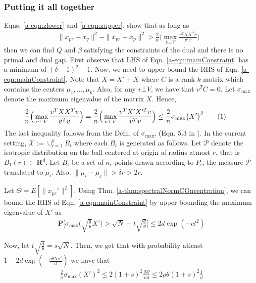 \documentclass[12pt]{article}
\newcommand{\mc}{\mathcal}
\newcommand{\mb}{\mathbf}
\newcommand\numberthis{\addtocounter{equation}{1}\tag{\theequation}}
\begin{document}
\subsubsection*{Putting it all together}
Eqns. \ref{a-eqn:zlower} and \ref{a-eqn:zupper}, show that as long as 
\begin{align}
  \|x_{pr} - x_q\|^2 - \|x_{pr}-x_p\|^2  > \frac{2}{n}\Big(\max_{v\bot V} \frac{v^T XX^Tv}{v^Tv}\Big)\label{a-eqn:mainConstraint}
\end{align}
  then we can find $Q$ and $\beta$ satisfying the constraints of the dual and there is no primal and dual gap. First observe that LHS of Eqn. \ref{a-eqn:mainConstraint} has a minimum of $(\delta - 1)^2 - 1$. Now, we need to upper bound the RHS of Eqn. \ref{a-eqn:mainConstraint}. Note that $X = X' + X$ where $C$ is a rank $k$ matrix which contains the centers $\mu_1, \ldots, \mu_k$. Also, for any $v \bot V$, we have that $v^TC = 0$. Let $\sigma_{\max}$ denote the maximum eigenvalue of the matrix $X$. Hence, 
\begin{align*}
  &\frac{2}{n}\Big(\max_{v\bot V} \frac{v^T XX^Tv}{v^Tv}\Big) = \frac{2}{n}\Big(\max_{v\bot V} \frac{v^T X'X'^Tv}{v^Tv}\Big) \le \frac{2}{n}\sigma_{\max}\big(X'\big)^2\numberthis\label{a-eqn:mainConstrintUpper}
\end{align*}
The last inequality follows from the Defn. of $\sigma_{\max}$. (Eqn. 5.3 in \cite{vershynin2010introduction}). In the current setting, $\mc X := \cup_{i=1}^k B_i$ where each $B_i$ is generated as follows. Let $\mc P$ denote the isotropic distribution on the ball centered at origin of radius atmost $r$, that is $B_1(r)\subset \mb R^d$. Let $B_i$ be a set of $n_i$ points drawn according to $P_i$, the measure $\mc P$ translated to $\mu_i$. Also, $\|\mu_i - \mu_j\| > \delta r > 2r$. 

Let $\Theta = E[\|x_{pr}'\|^2]$. Using Thm. \ref{a-thm:spectralNormCOncentration}, we can bound the RHS of Eqn. \ref{a-eqn:mainConstraint} by upper bounding the maximum eigenvalue of $X'$ as 
\begin{align}
  &\mb P\bigg[\sigma_{\max}\bigg(\sqrt{\frac{d}{\theta}}X'\bigg) > \sqrt{N} + t\sqrt{\frac{d}{\theta}} \bigg] \le 2d\exp(-ct^2)
\end{align}

Now, let $t\sqrt{\frac{d}{\theta}} = s\sqrt{N}$. Then, we get that with probability atleast $1-2d\exp(-\frac{c\theta Ns^2}{d})$ we have that 
\begin{align*}
  &\frac{2}{n}\sigma_{\max}(X')^2 \le 2(1+s)^2\frac{N\theta}{nd} \le 2\rho\theta (1+s)^2\frac{1}{d}
\end{align*}
\end{document}
